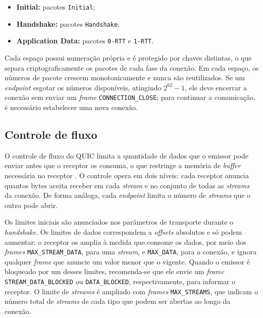 \begin{itemize}
    \item \textbf{Initial:} pacotes \texttt{Initial};
    \item \textbf{Handshake:} pacotes \texttt{Handshake};
    \item \textbf{Application Data:} pacotes \texttt{0-RTT} e \texttt{1-RTT}.
\end{itemize}

Cada espaço possui numeração própria e é protegido por chaves distintas, o que separa criptograficamente os pacotes de cada fase da conexão. Em cada espaço, os números de pacote crescem monotonicamente e nunca são reutilizados. Se um \textit{endpoint} esgotar os números disponíveis, atingindo $2^{62}-1$, ele deve encerrar a conexão sem enviar um \textit{frame} \texttt{CONNECTION\_\allowbreak{}CLOSE}; para continuar a comunicação, é necessário estabelecer uma nova conexão.

\subsection{Controle de fluxo}
\label{sec:quic_flow_control}

O controle de fluxo do QUIC limita a quantidade de dados que o emissor pode enviar antes que o receptor os consuma, o que restringe a memória de \textit{buffer} necessária no receptor \citep{rfc9000}. O controle opera em dois níveis: cada receptor anuncia quantos bytes aceita receber em cada \textit{stream} e no conjunto de todas as \textit{streams} da conexão. De forma análoga, cada \textit{endpoint} limita o número de \textit{streams} que o outro pode abrir.

Os limites iniciais são anunciados nos parâmetros de transporte durante o \textit{handshake}. Os limites de dados correspondem a \textit{offsets} absolutos e só podem aumentar: o receptor os amplia à medida que consome os dados, por meio dos \textit{frames} \texttt{MAX\_\allowbreak{}STREAM\_\allowbreak{}DATA}, para uma \textit{stream}, e \texttt{MAX\_\allowbreak{}DATA}, para a conexão, e ignora qualquer \textit{frame} que anuncie um valor menor que o vigente. Quando o emissor é bloqueado por um desses limites, recomenda-se que ele envie um \textit{frame} \texttt{STREAM\_\allowbreak{}DATA\_\allowbreak{}BLOCKED} ou \texttt{DATA\_\allowbreak{}BLOCKED}, respectivamente, para informar o receptor. O limite de \textit{streams} é ampliado com \textit{frames} \texttt{MAX\_\allowbreak{}STREAMS}, que indicam o número total de \textit{streams} de cada tipo que podem ser abertas ao longo da conexão.

